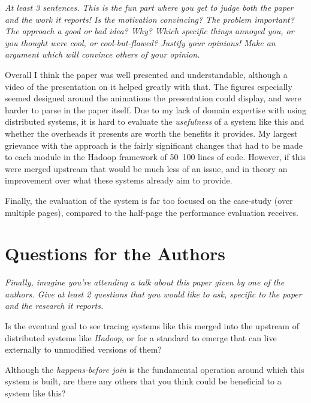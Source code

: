 \documentclass[11pt]{article}
\begin{document}
\textsl{At least 3 sentences. This is the fun part where you get to judge both
the paper and the work it reports! Is the motivation convincing? The problem
important? The approach a good or bad idea? Why? Which specific things annoyed
you, or you thought were cool, or cool-but-flawed? Justify your opinions! Make
an argument which will convince others of your opinion.}

Overall I think the paper was well presented and understandable, although a
video of the presentation on it helped greatly with that. The figures
especially seemed designed around the animations the presentation could
display, and were harder to parse in the paper itself. Due to my lack of domain
expertise with using distributed systems, it is hard to evaluate the
\textit{usefulness} of a system like this and whether the overheads it presents
are worth the benefits it provides. My largest grievance with the approach is
the fairly significant changes that had to be made to each module in the Hadoop
framework of 50~100 lines of code. However, if this were merged upstream that
would be much less of an issue, and in theory an improvement over what these
systems already aim to provide.

Finally, the evaluation of the system is far too focused on the case-study
(over multiple pages), compared to the half-page the performance evaluation
receives.


\section*{Questions for the Authors}

\textsl{Finally, imagine you're attending a talk about this paper given by one
of the authors. Give at least 2 questions that you would like to ask, specific
to the paper and the research it reports.}

Is the eventual goal to see tracing systems like this merged into the upstream
of distributed systems like \textit{Hadoop}, or for a standard to emerge that
can live externally to unmodified versions of them?

Although the \textit{happens-before join} is the fundamental operation around
which this system is built, are there any others that you think could be
beneficial to a system like this?




\end{document}

